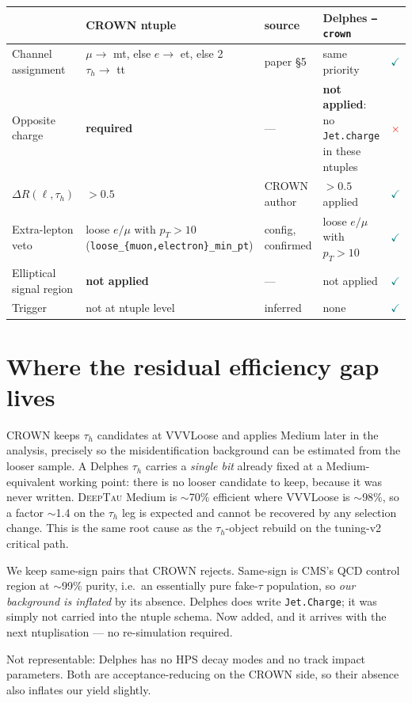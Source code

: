 \documentclass[11pt,a4paper]{article}
\newcommand{\tauh}{\tau_{h}}
\newcommand{\pt}{p_{T}}
\newcommand{\ok}{\textcolor{teal}{$\checkmark$}}
\newcommand{\no}{\textcolor{red}{$\times$}}
\begin{document}
\begin{table}[htbp]
\centering\small
\begin{tabular}{@{}lp{4.6cm}lp{4.3cm}c@{}}
\toprule
& \textbf{CROWN ntuple} & \textbf{source} & \textbf{Delphes \texttt{--crown}} & \\
\midrule
Channel assignment & $\mu\rightarrow$ mt, else $e\rightarrow$ et,
  else 2 $\tauh\rightarrow$ tt & paper \S5 & same priority & \ok \\
Opposite charge & \textbf{required} & --- & \textbf{not applied}: no
  \texttt{Jet.charge} in these ntuples & \no \\
$\Delta R(\ell,\tauh)$ & $>0.5$ & CROWN author & $>0.5$ applied & \ok \\
Extra-lepton veto & loose $e/\mu$ with $\pt>10$
  (\texttt{loose\_\{muon,electron\}\_min\_pt}) & config, confirmed
  & loose $e/\mu$ with $\pt>10$ & \ok \\
Elliptical signal region & \textbf{not applied} & --- & not applied & \ok \\
Trigger & not at ntuple level & inferred & none & \ok \\
\bottomrule
\end{tabular}
\end{table}

\section{Where the residual efficiency gap lives}

\begin{description}\itemsep3pt
\item[$\tauh$ working point --- the dominant term.] CROWN keeps $\tauh$ candidates at
  VVVLoose and applies Medium later in the analysis, precisely so the misidentification
  background can be estimated from the looser sample. A Delphes $\tauh$ carries a
  \emph{single bit} already fixed at a Medium-equivalent working point: there is no
  looser candidate to keep, because it was never written. \textsc{DeepTau} Medium is
  $\sim$70\% efficient where VVVLoose is $\sim$98\%, so a factor $\sim$1.4 on the
  $\tauh$ leg is expected and cannot be recovered by any selection change. This is the
  same root cause as the $\tauh$-object rebuild on the tuning-v2 critical path.
\item[Opposite charge --- works the other way.] We keep same-sign pairs that CROWN
  rejects. Same-sign is CMS's QCD control region at $\sim$99\% purity, i.e.\ an
  essentially pure fake-$\tau$ population, so \emph{our background is inflated} by its
  absence. Delphes does write \texttt{Jet.Charge}; it was simply not carried into the
  ntuple schema. Now added, and it arrives with the next ntuplisation --- no
  re-simulation required.
\item[Decay modes and impact parameters.] Not representable: Delphes has no HPS decay
  modes and no track impact parameters. Both are acceptance-reducing on the CROWN side,
  so their absence also inflates our yield slightly.
\end{description}
\end{document}
